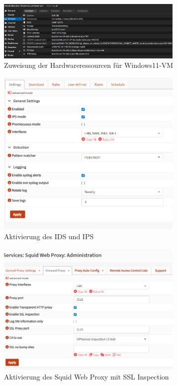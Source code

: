 \documentclass[12pt]{scrreprt}
\begin{document}
\begin{thebibliography}{99}
\begin{figure}[htbp]
	\centering
	\includegraphics[width=0.8\textwidth]{win11-hardware.png}
	\caption{Zuweisung der Hardwareressourcen für Windows11-VM}
	\label{fig:win11-hardware} %
\end{figure}

\begin{figure}[htbp]
	\centering
	\includegraphics[width=0.8\textwidth]{IPSopnsense.png}
	\caption{Aktivierung des IDS und IPS}
	\label{fig:ipsopn1} %
\end{figure}

\begin{figure}[htbp]
	\centering
	\includegraphics[width=0.8\textwidth]{squidproxy.png}
	\caption{Aktivierung des Squid Web Proxy mit SSL Inspection}
	\label{fig:squidproxy} %
\end{figure}


\end{thebibliography}
\end{document}
